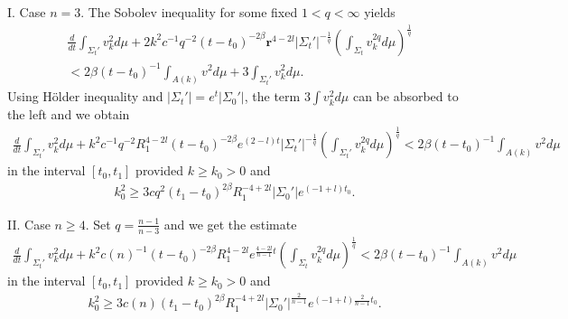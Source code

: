 \documentclass[12pt,twoside]{article}
\theoremstyle{plain}
\theoremstyle{definition}
\theoremstyle{remark}
\newcommand{\lt}{\left}
\newcommand{\rt}{\right}
\newcommand{\mr}{\mathbf{r}}
\numberwithin{equation}{section}
\begin{document}
I. Case $n=3$. The Sobolev inequality for some fixed $1<q < \infty$ yields
\begin{align*}
&\frac{d}{dt} \int_{\Sigma_t'} v_k^2 d\mu + 2 k^2  c^{-1}q^{-2} (t-t_0)^{-2\beta} \mr^{4-2l} |\Sigma_t'|^{-\frac{1}{q}} \lt( \int_{\Sigma_t} v_k^{2q} d\mu \rt)^\frac{1}{q} \\
&< 2\beta (t-t_0)^{-1} \int_{A(k)} v^2 d\mu + 3 \int_{\Sigma_t'} v_k^2 d\mu. 
\end{align*}
Using H\"{o}lder inequality and $|\Sigma_t'| = e^t |\Sigma_0'|$, the term $3 \int v_k^2 d\mu$ can be absorbed to the left and we obtain
\begin{align*}
\frac{d}{dt} \int_{\Sigma_t'} v_k^2 d\mu + k^2 c^{-1} q^{-2}R_1^{4-2l} (t-t_0)^{-2\beta} e^{(2-l)t} |\Sigma_t'|^{-\frac{1}{q}} \lt( \int_{\Sigma_t'} v_k^{2q} d\mu \rt)^\frac{1}{q} < 2\beta (t-t_0)^{-1} \int_{A(k)} v^2 d\mu
\end{align*}
in the interval $[t_0,t_1]$ provided $k \ge  k_0 >0$ and 
\begin{align}\label{k0_1}
k_0^2 \ge 3c q^2 (t_1 - t_0)^{2\beta} R_1^{-4+2l} |\Sigma_0'| e^{(-1+l)t_0}.
\end{align}

II. Case $n \ge 4$. Set $q = \frac{n-1}{n-3}$ and we get the estimate
\begin{align*}
\frac{d}{dt} \int_{\Sigma_t'} v_k^2 d\mu + k^2 c(n)^{-1}  (t-t_0)^{-2\beta} R_1^{4-2l} e^{\frac{4-2l}{n-1}t } \lt( \int_{\Sigma_t} v_k^{2q} d\mu \rt)^\frac{1}{q} < 2\beta (t-t_0)^{-1} \int_{A(k)} v^2 d\mu
\end{align*}
in the interval $[t_0,t_1]$ provided $k \ge k_0 >0$ and 
\begin{align}\label{k0_2}
k_0^2 \ge 3 c(n) (t_1-t_0)^{2\beta} R_1^{-4+2l} |\Sigma_0'|^{\frac{2}{n-1}} e^{(-1+l)\frac{2}{n-1} t_0}.
\end{align}
\end{document}
